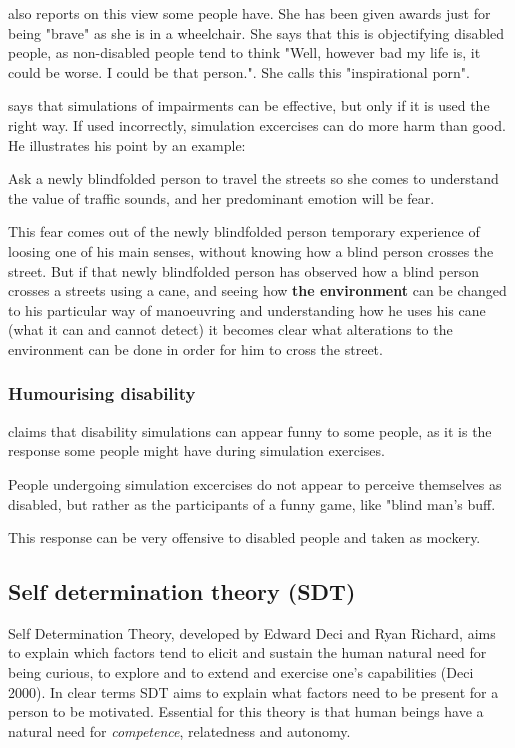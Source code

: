 \textcite{young_im_2014} also reports on this view some people have. She has been given awards just for being "brave" as she is in a wheelchair. She says that this is objectifying disabled people, as non-disabled people tend to think "Well, however bad my life is, it could be worse. I could be that person.". She calls this "inspirational porn".

\textcite{Riccobono2018} says that simulations of impairments can be effective, but only if it is used the right way. If used incorrectly, simulation excercises can do more harm than good. He illustrates his point by an example: 
\begin{displayquote}
    Ask a newly blindfolded person to travel the streets so she comes to understand the value of traffic sounds, and her predominant emotion will be fear.
\end{displayquote}

This fear comes out of the newly blindfolded person temporary experience of loosing one of his main senses, without knowing how a blind person crosses the street. But if that newly blindfolded person has observed how a blind person crosses a streets using a cane, and seeing how \textbf{the environment} can be changed to his particular way of manoeuvring and understanding how he uses his cane (what it can and cannot detect) it becomes clear what alterations to the environment can be done in order for him to cross the street.

\subsubsection{Humourising disability}
\textcite{French1992} claims that disability simulations can appear funny to some people, as it is the response some people might have during simulation exercises. \begin{displayquote}
    People undergoing simulation excercises do not appear to perceive themselves as disabled, but rather as the participants of a funny game, like "blind man's buff.
\end{displayquote} 

This response can be very offensive to disabled people and taken as mockery.

\subsection{Self determination theory (SDT)}
Self Determination Theory, developed by Edward Deci and Ryan Richard, aims to explain which factors tend to elicit and sustain the human natural need for being curious, to explore and to extend and exercise one's capabilities (Deci 2000). In clear terms SDT aims to explain what factors need to be present for a person to be motivated. Essential for this theory is that human beings have a natural need for \textit{competence}, relatedness and autonomy.

